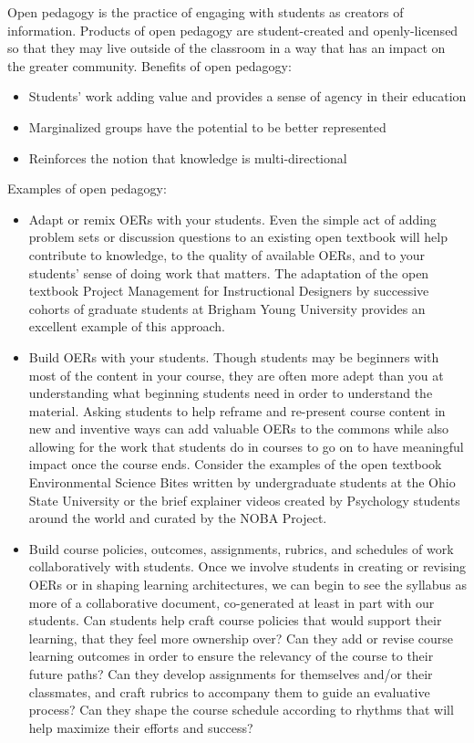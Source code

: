 \documentclass[11pt]{article}
\begin{document}
Open pedagogy is the practice of engaging with students as creators of information.  Products of open pedagogy are student-created and openly-licensed so that they may live outside of the classroom in a way that has an impact on the greater community.  Benefits of open pedagogy:
\begin{itemize}
  \item Students' work adding value and provides a sense of agency in their education
  \item Marginalized groups have the potential to be better represented
  \item Reinforces the notion that knowledge is multi-directional
\end{itemize}

Examples of open pedagogy:
\begin{itemize}
  \item Adapt or remix OERs with your students. Even the simple act of adding problem sets or discussion questions to an existing open textbook will help contribute to knowledge, to the quality of available OERs, and to your students' sense of doing work that matters. The adaptation of the open textbook Project Management for Instructional Designers by successive cohorts of graduate students at Brigham Young University provides an excellent example of this approach.
  \item Build OERs with your students. Though students may be beginners with most of the content in your course, they are often more adept than you at understanding what beginning students need in order to understand the material. Asking students to help reframe and re-present course content in new and inventive ways can add valuable OERs to the commons while also allowing for the work that students do in courses to go on to have meaningful impact once the course ends. Consider the examples of the open textbook Environmental Science Bites written by undergraduate students at the Ohio State University or the brief explainer videos created by Psychology students around the world and curated by the NOBA Project.
  \item Build course policies, outcomes, assignments, rubrics, and schedules of work collaboratively with students. Once we involve students in creating or revising OERs or in shaping learning architectures, we can begin to see the syllabus as more of a collaborative document, co-generated at least in part with our students. Can students help craft course policies that would support their learning, that they feel more ownership over? Can they add or revise course learning outcomes in order to ensure the relevancy of the course to their future paths? Can they develop assignments for themselves and/or their classmates, and craft rubrics to accompany them to guide an evaluative process? Can they shape the course schedule according to rhythms that will help maximize their efforts and success?

\end{itemize}
\end{document}
